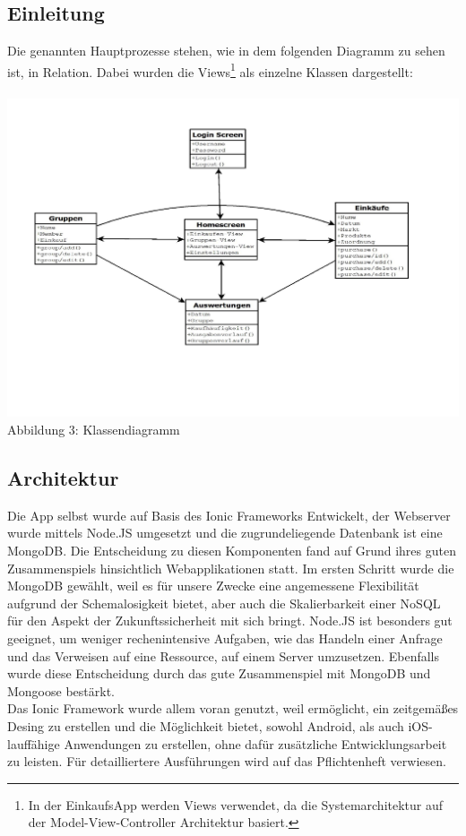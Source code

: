 \documentclass[12pt,a4paper]{article}
\begin{document}
\subsection*{Einleitung}
Die genannten Hauptprozesse stehen, wie in dem folgenden Diagramm zu sehen ist, in Relation. Dabei wurden die Views\footnote {In der EinkaufsApp werden Views verwendet, da die Systemarchitektur auf der Model-View-Controller Architektur basiert.}  als einzelne Klassen dargestellt:
\\
\\
\hspace*{-10mm} 
\includegraphics[trim = 17mm 30mm 0mm 20mm,clip,scale=0.7]{Klassendiagramm.pdf}
\\
\footnotesize Abbildung 3: Klassendiagramm
\normalsize

\subsection{Architektur}

Die App selbst wurde auf Basis des Ionic Frameworks Entwickelt, der Webserver wurde mittels Node.JS umgesetzt und die zugrundeliegende Datenbank ist eine MongoDB. Die Entscheidung zu diesen Komponenten fand auf Grund ihres guten Zusammenspiels hinsichtlich Webapplikationen statt. Im ersten Schritt wurde die MongoDB gewählt, weil es für unsere Zwecke eine angemessene Flexibilität aufgrund der Schemalosigkeit bietet, aber auch die Skalierbarkeit einer NoSQL für den Aspekt der Zukunftssicherheit mit sich bringt. Node.JS ist besonders gut geeignet, um weniger rechenintensive Aufgaben, wie das Handeln einer Anfrage und das Verweisen auf eine Ressource, auf einem Server umzusetzen. Ebenfalls wurde diese Entscheidung durch das gute Zusammenspiel mit MongoDB und Mongoose bestärkt. 
\\
Das Ionic Framework wurde allem voran genutzt, weil ermöglicht, ein zeitgemäßes Desing zu erstellen und die Möglichkeit bietet, sowohl Android, als auch iOS-lauffähige Anwendungen zu erstellen, ohne dafür zusätzliche Entwicklungsarbeit zu leisten.
Für detailliertere Ausführungen wird auf das Pflichtenheft verwiesen.
\end{document}
